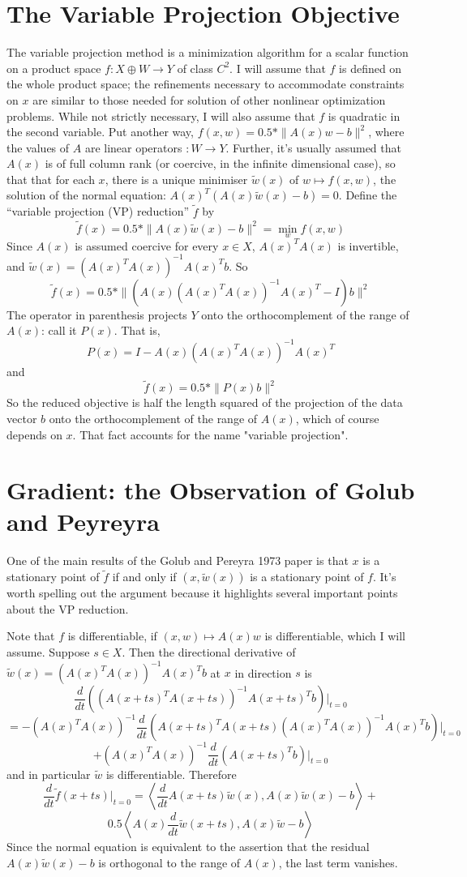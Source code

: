 \section{The Variable Projection Objective}
The variable projection method is a minimization algorithm for a scalar function on a product space $f:X \oplus W \rightarrow Y$ of class $C^2$. I will assume that $f$ is defined on the whole product space; the refinements necessary to accommodate constraints on $x$ are similar to those needed for solution of other nonlinear optimization problems. While not strictly necessary, I will also assume that $f$ is quadratic in the second variable. Put another way, $f(x,w) = 0.5*\|A(x)w-b\|^2$, where the values of $A$ are linear operators $: W \rightarrow Y$. Further, it's usually assumed that $A(x)$ is of full column rank (or coercive, in the infinite dimensional case), so that that for each $x$, there is a unique minimiser $\tilde{w}(x)$ of $w \mapsto f(x,w)$, the solution of the normal equation: $A(x)^T(A(x)\tilde{w}(x) - b)=0$. Define the ``variable projection (VP) reduction'' $\tilde{f}$ by 
$$
\tilde{f}(x) = 0.5*\|A(x)\tilde{w}(x)-b\|^2= \min_w f(x,w)
$$
Since $A(x)$ is assumed coercive for every $x \in X$, $A(x)^TA(x)$ is invertible, and $\tilde{w}(x) = (A(x)^TA(x))^{-1}A(x)^Tb$. So
$$ 
\tilde{f}(x) = 0.5*\|(A(x)(A(x)^TA(x))^{-1}A(x)^T - I)b\|^2
$$
The operator in parenthesis projects $Y$ onto the orthocomplement of the range of $A(x)$: call it $P(x)$. That is,
$$
P(x) = I-A(x)(A(x)^TA(x))^{-1}A(x)^T
$$
and
$$
\tilde{f}(x) = 0.5*\|P(x)b\|^2
$$
So the reduced objective is half the length squared of the projection of the data vector $b$ onto the orthocomplement of the range of $A(x)$, which of course depends on $x$. That fact accounts for the name "variable projection".

\section{Gradient: the Observation of Golub and Peyreyra}

One of the main results of the Golub and Pereyra 1973 paper is that $x$ is a stationary point of $\tilde{f}$ if and only if $(x,\tilde{w}(x))$ is a stationary point of $f$. It's worth spelling out the argument because it highlights several important points about the VP reduction.

Note that $f$ is differentiable, if $(x,w)\mapsto A(x)w$ is differentiable, which I will assume. Suppose $s \in X$. Then the directional derivative of $\tilde{w}(x)=(A(x)^TA(x))^{-1}A(x)^Tb$ at $x$ in direction $s$ is 
$$
\frac{d}{dt}((A(x+ts)^TA(x+ts))^{-1}A(x+ts)^Tb)|_{t=0}
$$
$$
=-(A(x)^TA(x))^{-1}\frac{d}{dt}(A(x+ts)^TA(x+ts)(A(x)^TA(x))^{-1}A(x)^Tb)|_{t=0}
$$
$$
+ (A(x)^TA(x))^{-1}\frac{d}{dt}(A(x+ts)^Tb)|_{t=0}
$$
and in particular $\tilde{w}$ is differentiable. Therefore
$$
\frac{d}{dt}\tilde{f}(x+ts)|_{t=0} = \left\langle\frac{d}{dt}A(x+ts)\tilde{w}(x), A(x)\tilde{w}(x)-b\right\rangle + 
$$
$$
0.5\left\langle A(x)\frac{d}{dt}\tilde{w}(x+ts),A(x)\tilde{w}-b\right\rangle
$$
Since the normal equation is equivalent to the assertion that the residual $A(x)\tilde{w}(x)-b$ is orthogonal to the range of $A(x)$, the last term vanishes.


